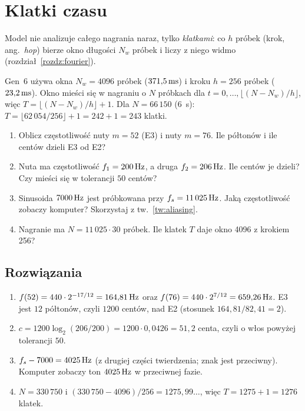\section{Klatki czasu}

Model nie analizuje całego nagrania naraz, tylko \emph{klatkami}: co $h$ próbek (krok, ang.\ \emph{hop}) bierze okno
długości $N_w$ próbek i liczy z niego widmo (rozdział~\ref{rozdz:fourier}).

\begin{przyklad}\label{prz:klatki}
Gen~6 używa okna $N_w=4096$ próbek ($371{,}5\,\mathrm{ms}$) i kroku $h=256$ próbek ($23{,}2\,\mathrm{ms}$). Okno mieści się w nagraniu
o $N$ próbkach dla $t=0,\dots,\lfloor(N-N_w)/h\rfloor$, więc
$T=\lfloor(N-N_w)/h\rfloor+1$. Dla $N=66\,150$ ($6$~s): $T=\lfloor 62\,054/256\rfloor+1=242+1=243$ klatki.
\end{przyklad}

\begin{sprawdz}
\begin{enumerate}
\item Oblicz częstotliwość nuty $m=52$ (E3) i nuty $m=76$. Ile półtonów i ile centów dzieli E3 od E2?
\item Nuta ma częstotliwość $f_1=200\,\mathrm{Hz}$, a druga $f_2=206\,\mathrm{Hz}$. Ile centów je dzieli? Czy mieści się w tolerancji $50$ centów?
\item Sinusoida $7000\,\mathrm{Hz}$ jest próbkowana przy $f_s=11\,025\,\mathrm{Hz}$. Jaką częstotliwość zobaczy komputer? Skorzystaj z tw.~\ref{tw:aliasing}.
\item Nagranie ma $N=11\,025\cdot 30$ próbek. Ile klatek $T$ daje okno 4096 z krokiem 256?
\end{enumerate}
\end{sprawdz}

\subsection*{Rozwiązania}
\begin{enumerate}
\item $f(52)=440\cdot2^{-17/12}=164{,}81\,\mathrm{Hz}$ oraz $f(76)=440\cdot 2^{7/12}=659{,}26\,\mathrm{Hz}$. E3 jest $12$ półtonów, czyli $1200$ centów, nad E2 (stosunek $164{,}81/82{,}41=2$).
\item $c=1200\log_2(206/200)=1200\cdot0{,}0426=51{,}2$ centa, czyli o włos powyżej tolerancji $50$.
\item $f_s-7000=4025\,\mathrm{Hz}$ (z drugiej części twierdzenia; znak jest przeciwny). Komputer zobaczy ton $4025\,\mathrm{Hz}$ w przeciwnej fazie.
\item $N=330\,750$ i $(330\,750-4096)/256=1275{,}99\ldots$, więc $T=1275+1=1276$ klatek.
\end{enumerate}

